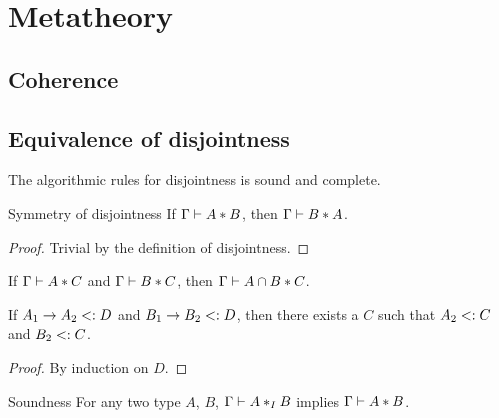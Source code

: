 \section{Metatheory}

\subsection{Coherence}

\subsection{Equivalence of disjointness}

The algorithmic rules for disjointness is sound and complete.

\begin{lemma}{Symmetry of disjointness} \label{symmetry-of-disjointness}
  If $\Gamma \vdash A * B$, then $\Gamma \vdash B * A$.
\end{lemma}

\begin{proof}
  Trivial by the definition of disjointness.
\end{proof}

\begin{theorem} \label{disjoint-intersect}
  If $\Gamma \vdash A * C$ and $\Gamma \vdash B * C$,
  then $\Gamma \vdash A \cap B * C$.
\end{theorem}

\begin{lemma} \label{common-supertype}
  If $A_1 \to A_2 <: D$ and $B_1 \to B_2 <: D$,
  then there exists a $C$ such that $A_2 <: C$ and $B_2 <: C$.
\end{lemma}

\begin{proof}
  By induction on $D$.
\end{proof}

\begin{theorem}{Soundness}
  For any two type $A$, $B$, $\Gamma \vdash A *_I B$ implies $\Gamma \vdash A * B$.
\end{theorem}

